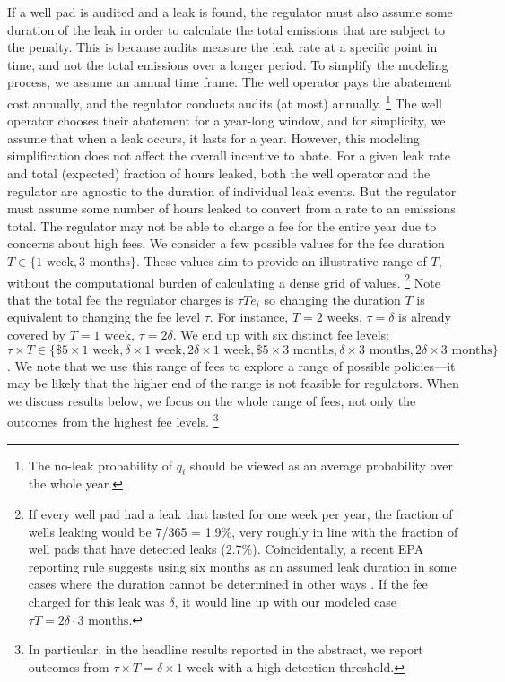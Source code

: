 If a well pad is audited and a leak is found, the regulator must also assume some duration of the leak in order to calculate the total emissions that are subject to the penalty.
This is because audits measure the leak rate at a specific point in time, and not the total emissions over a longer period.
To simplify the modeling process, we assume an annual time frame.
The well operator pays the abatement cost annually, and the regulator conducts audits (at most) annually.%
\footnote{The no-leak probability of \(q_i\) should be viewed as an average probability over the whole year.}
The well operator chooses their abatement for a year-long window, and for simplicity, we assume that when a leak occurs, it lasts for a year.
However, this modeling simplification does not affect the overall incentive to abate.
For a given leak rate and total (expected) fraction of hours leaked, both the well operator and the regulator are agnostic to the duration of individual leak events.
But the regulator must assume some number of hours leaked to convert from a rate to an emissions total.
The regulator may not be able to charge a fee for the entire year due to concerns about high fees.
We consider a few possible values for the fee duration
\(T \in \{\text{1 week}, \text{3 months}\}\).
These values aim to provide an illustrative range of \(T\), without the computational burden of calculating a dense grid of values.%
\footnote{%
If every well pad had a leak that lasted for one week per year, the fraction of wells leaking would be 7/365 = 1.9\%, very roughly in line with the fraction of well pads that have detected leaks (2.7\%).
Coincidentally, a recent EPA reporting rule suggests using six months as an assumed leak duration in some cases where the duration cannot be determined in other ways \parencite{EPA-monitoring-2023}.
If the fee charged for this leak was \(\delta\), it would line up with our modeled case \(\tau T = 2 \delta \cdot \text{3 months}\).
}
Note that the total fee the regulator charges is \(\tau T e_i\) so changing the duration \(T\) is equivalent to changing the fee level \(\tau\).
For instance, \(T = \text{2 weeks}\), \(\tau = \delta\) is already covered by \(T = \text{1 week}\), \(\tau = 2\delta\).
We end up with six distinct fee levels:
\(\tau \times T \in \{
\text{\$5}\times \text{1 week},
\delta\times \text{1 week},
\text{2}\delta\times \text{1 week},
\text{\$5}\times \text{3 months},
\delta\times \text{3 months},
\text{2}\delta\times \text{3 months}
\}\).
We note that we use this range of fees to explore a range of possible policies---it may be likely that the higher end of the range is not feasible for regulators.
When we discuss results below, we focus on the whole range of fees, not only the outcomes from the highest fee levels.%
\footnote{In particular, in the headline results reported in the abstract, we report outcomes from
\(\tau \times T = \delta \times \text{1 week}\) with a high detection threshold.
}

